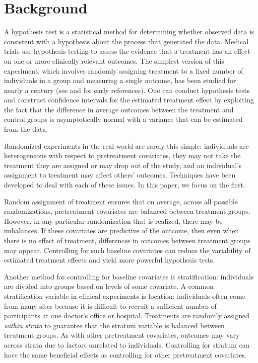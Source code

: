 \documentclass[11pt]{article}
\begin{document}
\section{Background}
A hypothesis test is a statistical method for determining whether observed data is consistent with a hypothesis about the process that generated the data.
Medical trials use hypothesis testing to assess the evidence that a treatment has an effect on one or more clinically relevant outcomes.
The simplest version of this experiment, which involves randomly assigning treatment to a fixed number of individuals in a group and measuring a single outcome, has been studied for nearly a century (see \citet{fisher_design_1935} and \citet{neyman_application_1923} for early references).
One can conduct hypothesis tests and construct confidence intervals for the estimated treatment effect
by exploiting the fact that the difference in average outcomes between the treatment and control groups is asymptotically normal with a variance that can be estimated from the data.

Randomized experiments in the real world are rarely this simple:
individuals are heterogeneous with respect to pretreatment covariates,
they may not take the treatment they are assigned or may drop out of the study,
and an individual's assignment to treatment may affect others' outcomes.
Techniques have been developed to deal with each of these issues.
In this paper, we focus on the first.

Random assignment of treatment ensures that on average, across all possible randomizations, pretreatment covariates are balanced between treatment groups.
However, in any particular randomization that is realized, there may be imbalances.
If these covariates are predictive of the outcome, then even when there is no effect of treatment, differences in outcomes between treatment groups may appear.
Controlling for such baseline covariates can reduce the variability of estimated treatment effects and yield more powerful hypothesis tests.

Another method for controlling for baseline covariates is stratification:
individuals are divided into groups based on levels of some covariate.
A common stratification variable in clinical experiments is location:
individuals often come from many sites because it is difficult to recruit a sufficient number of participants at one doctor's office or hospital.
Treatments are randomly assigned  \textit{within strata} to guarantee that the stratum variable is balanced between treatment groups.
As with other pretreatment covariates, outcomes may vary across strata due to factors unrelated to individuals.
Controlling for stratum can have the same beneficial effects as controlling for other pretreatment covariates.
\end{document}
